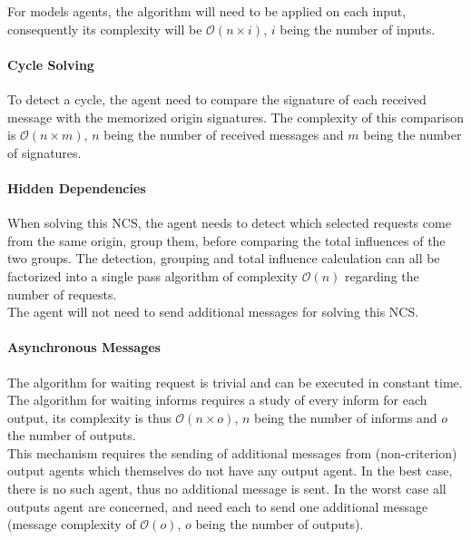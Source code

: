 For models agents, the algorithm will need to be applied on each input, consequently its complexity will be $\mathcal{O}(n \times i)$, $i$ being the number of inputs.

\paragraph*{Cycle Solving}

To detect a cycle, the agent need to compare the signature of each received message with the memorized origin signatures. The complexity of this comparison is $\mathcal{O}(n \times m)$, $n$ being the number of received messages and $m$ being the number of signatures.

\paragraph*{Hidden Dependencies}
When solving this NCS, the agent needs to detect which selected requests come from the same origin, group them, before comparing the total influences of the two groups. The detection, grouping and total influence calculation can all be factorized into a single pass algorithm of complexity $\mathcal{O}(n)$ regarding the number of requests.\\
The agent will not need to send additional messages for solving this NCS.

\paragraph*{Asynchronous Messages}

The algorithm for waiting request is trivial and can be executed in constant time. The algorithm for waiting informs requires a study of every inform for each output, its complexity is thus $\mathcal{O}(n \times o)$, $n$ being the number of informs and $o$ the number of outputs.\\
This mechanism requires the sending of additional messages from (non-criterion) output agents which themselves do not have any output agent. In the best case, there is no such agent, thus no additional message is sent. In the worst case all outputs agent are concerned, and need each to send one additional message (message complexity of $\mathcal{O}(o)$, $o$ being the number of outputs).

